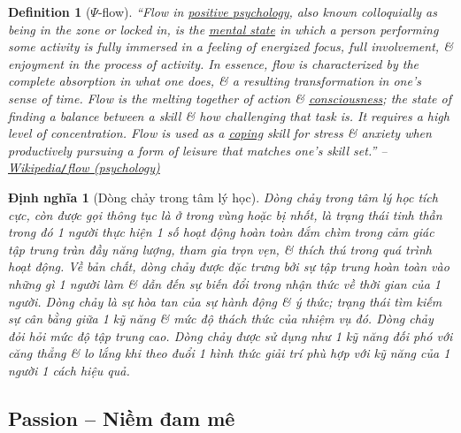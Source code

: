 \documentclass[12pt]{article}
\newtheorem{definition}{Definition}[section]
\newtheorem{dinhnghia}{Định nghĩa}[section]
\begin{document}
\begin{definition}[$\Psi$-flow]
	``\emph{Flow} in \href{https://en.wikipedia.org/wiki/Positive_psychology}{positive psychology}, also known colloquially as being \emph{in the zone} or \emph{locked in}, is the \href{https://en.wikipedia.org/wiki/Mental_state}{mental state} in which a person performing some activity is fully immersed in a feeling of energized focus, full involvement, \& enjoyment in the process of activity. In essence, flow is characterized by the complete absorption in what one does, \& a resulting transformation in one's sense of time. Flow is the melting together of action \& \href{https://en.wikipedia.org/wiki/Consciousness}{consciousness}; the state of finding a balance between a skill \& how challenging that task is. It requires a high level of concentration. Flow is used as a \href{https://en.wikipedia.org/wiki/Coping}{coping} skill for stress \& anxiety when productively pursuing a form of leisure  that matches one's skill set.'' -- \href{https://en.wikipedia.org/wiki/Flow_(psychology)}{Wikipedia{\tt/}flow (psychology)}
\end{definition}

\begin{dinhnghia}[Dòng chảy trong tâm lý học]
	\emph{Dòng chảy} trong tâm lý học tích cực, còn được gọi thông tục là \emph{ở trong vùng} hoặc \emph{bị nhốt}, là trạng thái tinh thần trong đó 1 người thực hiện 1 số hoạt động hoàn toàn đắm chìm trong cảm giác tập trung tràn đầy năng lượng, tham gia trọn vẹn, \& thích thú trong quá trình hoạt động. Về bản chất, dòng chảy được đặc trưng bởi sự tập trung hoàn toàn vào những gì 1 người làm \& dẫn đến sự biến đổi trong nhận thức về thời gian của 1 người. Dòng chảy là sự hòa tan của sự hành động \& ý thức; trạng thái tìm kiếm sự cân bằng giữa 1 kỹ năng \& mức độ thách thức của nhiệm vụ đó. Dòng chảy đỏi hỏi mức độ tập trung cao. Dòng chảy được sử dụng như 1 kỹ năng đối phó với căng thẳng \& lo lắng khi theo đuổi 1 hình thức giải trí phù hợp với kỹ năng của 1 người 1 cách hiệu quả. 
\end{dinhnghia}

\subsection{Passion -- Niềm đam mê}
\end{document}
